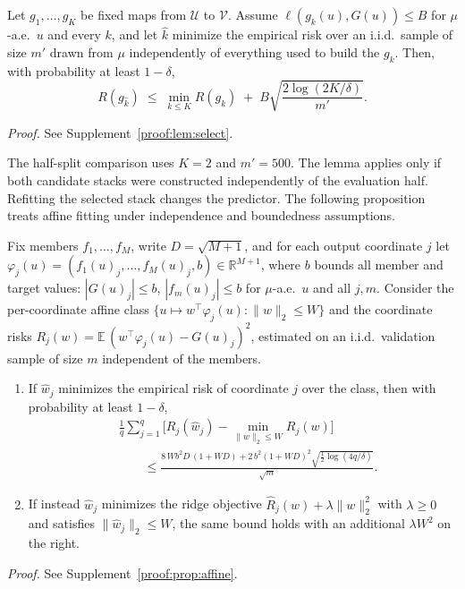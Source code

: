 \begin{lemma}\label{lem:select}
Let $g_1,\dots,g_K$ be fixed maps from $\mathcal U$ to $\mathcal V$. Assume
$\ell(g_k(u),G(u))\le B$ for $\mu$-a.e.\ $u$ and every $k$, and let
$\widehat k$ minimize the empirical risk over an i.i.d.\ sample of size $m'$
drawn from $\mu$ independently of everything used to build the $g_k$. Then,
with probability at least $1-\delta$,
\[
R(g_{\widehat k})\;\le\;\min_{k\le K}R(g_k)\;+\;
B\sqrt{\frac{2\log(2K/\delta)}{m'}} .
\]
\end{lemma}
\noindent\emph{Proof.} See Supplement~\ref{proof:lem:select}.


The half-split comparison uses $K=2$ and $m'=500$. The lemma applies
only if both candidate stacks were constructed independently of the evaluation
half. Refitting the selected stack changes the predictor. The following
proposition treats affine fitting under independence and boundedness
assumptions.

\begin{proposition}\label{prop:affine}
Fix members $f_1,\dots,f_M$, write $D=\sqrt{M+1}$, and for each output
coordinate $j$ let $\varphi_j(u)=(f_1(u)_j,\dots,f_M(u)_j,b)\in\mathbb R^{M+1}$,
where $b$ bounds all member and target values:
$|G(u)_j|\le b$, $|f_m(u)_j|\le b$ for $\mu$-a.e.\ $u$ and all $j,m$. Consider
the per-coordinate affine class
$\{u\mapsto w^\top\varphi_j(u):\|w\|_2\le W\}$ and the coordinate risks
$R_j(w)=\mathbb E\,(w^\top\varphi_j(u)-G(u)_j)^2$, estimated on an i.i.d.\
validation sample of size $m$ independent of the members.
\begin{enumerate}
\item[(i)] If $\widehat w_j$ minimizes the empirical risk of coordinate $j$
over the class, then with probability at least $1-\delta$,
\[
\begin{aligned}
&\frac1q\sum_{j=1}^q\Big[R_j(\widehat w_j)-\min_{\|w\|_2\le W}R_j(w)\Big]\\
&\qquad\le\frac{8\,W b^2 D\,(1+WD)+2\,b^2(1+WD)^2\sqrt{\tfrac12\log(4q/\delta)}}{\sqrt m}.
\end{aligned}
\]
\item[(ii)] If instead $\widehat w_j$ minimizes the ridge objective
$\widehat R_j(w)+\lambda\|w\|_2^2$ with $\lambda\ge0$ and satisfies $\|\widehat w_j\|_2\le W$,
the same bound holds with an additional $\lambda W^2$ on the right.
\end{enumerate}
\end{proposition}
\noindent\emph{Proof.} See Supplement~\ref{proof:prop:affine}.


